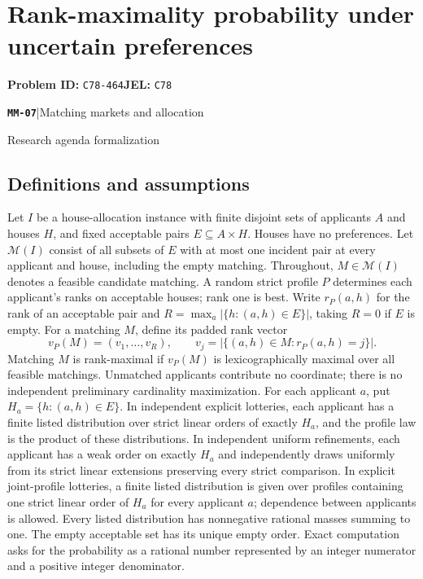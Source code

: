\documentclass[11pt,a4paper]{article}
\newcommand{\entrymeta}[3]{{\sffamily\small\color{muted}\textbf{\texttt{#1}}\quad|\quad #2\par #3\par}}
\begin{document}
\section*{Rank-maximality probability under uncertain preferences}
\textbf{Problem ID:} \texttt{C78-464}\quad \textbf{JEL:} \texttt{C78}\par
\label{problem:OP-0548}
\label{beyond:MM-07}
\entrymeta{MM-07}{Matching markets and allocation}{Research agenda formalization}
\subsection*{Definitions and assumptions}
Let $I$ be a house-allocation instance with finite disjoint sets of applicants $A$ and houses $H$, and fixed acceptable pairs $E\subseteq A\times H$. Houses have no preferences. Let $\mathcal M(I)$ consist of all subsets of $E$ with at most one incident pair at every applicant and house, including the empty matching. Throughout, $M\in\mathcal M(I)$ denotes a feasible candidate matching. A random strict profile $P$ determines each applicant's ranks on acceptable houses; rank one is best. Write $r_P(a,h)$ for the rank of an acceptable pair and $R=\max_a|\{h:(a,h)\in E\}|$, taking $R=0$ if $E$ is empty. For a matching $M$, define its padded rank vector
\[
 v_P(M)=(v_1,\ldots,v_R),\qquad
 v_j=|\{(a,h)\in M:r_P(a,h)=j\}|.
\]
Matching $M$ is rank-maximal if $v_P(M)$ is lexicographically maximal over all feasible matchings. Unmatched applicants contribute no coordinate; there is no independent preliminary cardinality maximization.
For each applicant $a$, put $H_a=\{h:(a,h)\in E\}$. In independent explicit lotteries, each applicant has a finite listed distribution over strict linear orders of exactly $H_a$, and the profile law is the product of these distributions. In independent uniform refinements, each applicant has a weak order on exactly $H_a$ and independently draws uniformly from its strict linear extensions preserving every strict comparison. In explicit joint-profile lotteries, a finite listed distribution is given over profiles containing one strict linear order of $H_a$ for every applicant $a$; dependence between applicants is allowed. Every listed distribution has nonnegative rational masses summing to one. The empty acceptable set has its unique empty order. Exact computation asks for the probability as a rational number represented by an integer numerator and a positive integer denominator.
\end{document}
